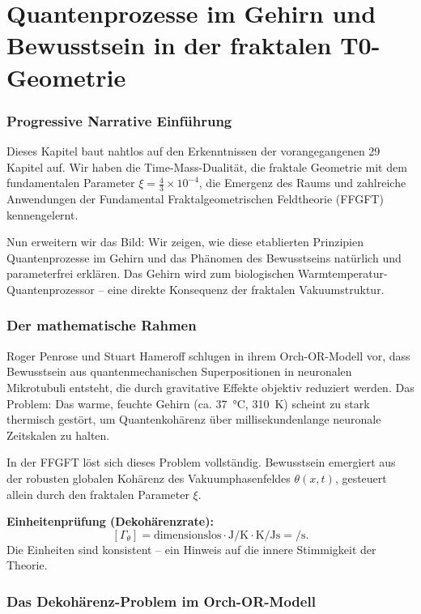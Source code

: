 \chapter{Quantenprozesse im Gehirn und Bewusstsein in der fraktalen T0-Geometrie}


	
	\subsection*{Progressive Narrative Einführung}
	
	Dieses Kapitel baut nahtlos auf den Erkenntnissen der vorangegangenen 29 Kapitel auf. Wir haben die Time-Mass-Dualität, die fraktale Geometrie mit dem fundamentalen Parameter \(\xi = \frac{4}{3} \times 10^{-4}\), die Emergenz des Raums und zahlreiche Anwendungen der Fundamental Fraktalgeometrischen Feldtheorie (FFGFT) kennengelernt.
	
	Nun erweitern wir das Bild: Wir zeigen, wie diese etablierten Prinzipien Quantenprozesse im Gehirn und das Phänomen des Bewusstseins natürlich und parameterfrei erklären. Das Gehirn wird zum biologischen Warmtemperatur-Quantenprozessor – eine direkte Konsequenz der fraktalen Vakuumstruktur.
	
	\subsection*{Der mathematische Rahmen}
	
	Roger Penrose und Stuart Hameroff schlugen in ihrem Orch-OR-Modell vor, dass Bewusstsein aus quantenmechanischen Superpositionen in neuronalen Mikrotubuli entsteht, die durch gravitative Effekte objektiv reduziert werden. Das Problem: Das warme, feuchte Gehirn (ca. \SI{37}{\degreeCelsius}, \SI{310}{\kelvin}) scheint zu stark thermisch gestört, um Quantenkohärenz über millisekundenlange neuronale Zeitskalen zu halten.
	
	In der FFGFT löst sich dieses Problem vollständig. Bewusstsein emergiert aus der robusten globalen Kohärenz des Vakuumphasenfeldes \(\theta(x,t)\), gesteuert allein durch den fraktalen Parameter \(\xi\).
	
	\textbf{Einheitenprüfung (Dekohärenzrate):}
	\[
	[\Gamma_{\theta}] = \text{dimensionslos} \cdot \si{\joule\per\kelvin} \cdot \si{\kelvin} / \si{\joule\second} = \si{\per\second}.
	\]
	Die Einheiten sind konsistent – ein Hinweis auf die innere Stimmigkeit der Theorie.
	
	\subsection*{Das Dekohärenz-Problem im Orch-OR-Modell}
	
